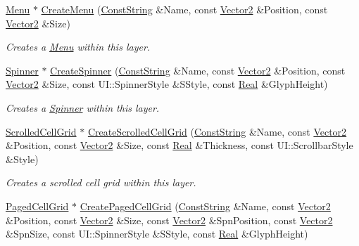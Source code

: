 \begin{DoxyCompactItemize}
\hyperlink{classphys_1_1UI_1_1Menu}{Menu} $\ast$ \hyperlink{classphys_1_1UI_1_1Layer_a49e7872455622d7e17871fd5fa4c41c1}{CreateMenu} (\hyperlink{namespacephys_a5ce5049f8b4bf88d6413c47b504ebb31}{ConstString} \&Name, const \hyperlink{classphys_1_1Vector2}{Vector2} \&Position, const \hyperlink{classphys_1_1Vector2}{Vector2} \&Size)
\begin{DoxyCompactList}\small\item\em Creates a \hyperlink{classphys_1_1UI_1_1Menu}{Menu} within this layer. \item\end{DoxyCompactList}\item 
\hyperlink{classphys_1_1UI_1_1Spinner}{Spinner} $\ast$ \hyperlink{classphys_1_1UI_1_1Layer_a7da3e07d9df3908f89b68b9d1705aad7}{CreateSpinner} (\hyperlink{namespacephys_a5ce5049f8b4bf88d6413c47b504ebb31}{ConstString} \&Name, const \hyperlink{classphys_1_1Vector2}{Vector2} \&Position, const \hyperlink{classphys_1_1Vector2}{Vector2} \&Size, const UI::SpinnerStyle \&SStyle, const \hyperlink{namespacephys_af7eb897198d265b8e868f45240230d5f}{Real} \&GlyphHeight)
\begin{DoxyCompactList}\small\item\em Creates a \hyperlink{classphys_1_1UI_1_1Spinner}{Spinner} within this layer. \item\end{DoxyCompactList}\item 
\hyperlink{classphys_1_1UI_1_1ScrolledCellGrid}{ScrolledCellGrid} $\ast$ \hyperlink{classphys_1_1UI_1_1Layer_afd17e29c5dcd4a36b884e07f42c1907f}{CreateScrolledCellGrid} (\hyperlink{namespacephys_a5ce5049f8b4bf88d6413c47b504ebb31}{ConstString} \&Name, const \hyperlink{classphys_1_1Vector2}{Vector2} \&Position, const \hyperlink{classphys_1_1Vector2}{Vector2} \&Size, const \hyperlink{namespacephys_af7eb897198d265b8e868f45240230d5f}{Real} \&Thickness, const UI::ScrollbarStyle \&Style)
\begin{DoxyCompactList}\small\item\em Creates a scrolled cell grid within this layer. \item\end{DoxyCompactList}\item 
\hyperlink{classphys_1_1UI_1_1PagedCellGrid}{PagedCellGrid} $\ast$ \hyperlink{classphys_1_1UI_1_1Layer_a536c636ead9c0ff283fa655ab4bf68f8}{CreatePagedCellGrid} (\hyperlink{namespacephys_a5ce5049f8b4bf88d6413c47b504ebb31}{ConstString} \&Name, const \hyperlink{classphys_1_1Vector2}{Vector2} \&Position, const \hyperlink{classphys_1_1Vector2}{Vector2} \&Size, const \hyperlink{classphys_1_1Vector2}{Vector2} \&SpnPosition, const \hyperlink{classphys_1_1Vector2}{Vector2} \&SpnSize, const UI::SpinnerStyle \&SStyle, const \hyperlink{namespacephys_af7eb897198d265b8e868f45240230d5f}{Real} \&GlyphHeight)

\end{DoxyCompactItemize}
